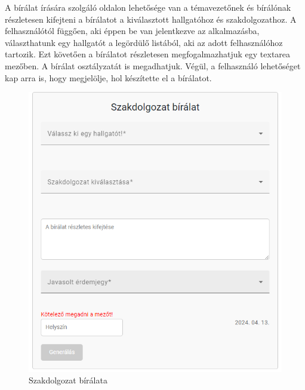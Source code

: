 A bírálat írására szolgáló oldalon lehetősége van a témavezetőnek és bírálónak részletesen kifejteni a bírálatot a kiválasztott hallgatóhoz és szakdolgozathoz. A felhasználótól függően, aki éppen be van jelentkezve az alkalmazásba, választhatunk egy hallgatót a legördülő listából, aki az adott felhasználóhoz tartozik. Ezt követően a bírálatot részletesen megfogalmazhatjuk egy textarea mezőben. A bírálat osztályzatát is megadhatjuk. Végül, a felhasználó lehetőséget kap arra is, hogy megjelölje, hol készítette el a bírálatot.


\begin{figure}[h]
\centering
\includegraphics[scale=0.5]{images/Review.png}
\caption{Szakdolgozat bírálata}
\label{fig:Review}
\end{figure}

\newpage


